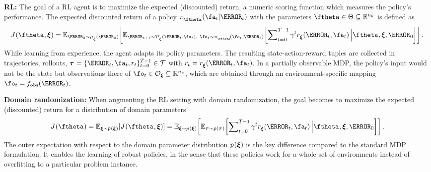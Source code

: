 \documentclass[utf8]{frontiersSCNS} %
\begin{document}
\noindent\textbf{\acf{RL}:} The goal of a \ac{RL} agent is to maximize the expected (discounted) return, a numeric scoring function which measures the policy's performance.
The expected discounted return of a policy $\pol[\polparams]{\given{\fa_t}{\fs_t}}$ with the parameters $\polparams \in \Theta \subseteq \RR^{\dimpolparam}$ is defined as
\begin{equation}
	\label{eq_sota_edr}
	\edr{\polparams,\domparams} =
	\Esub{\fs_0 \sim \initstatedistr*[\domparams]{\fs_0}}{
		\Esub{ \fs_{t+1} \sim \transprob*[\domparams]{\fs_t,\fa_t},\ \fa_t \sim \pol[\polparams]{\given{\fa_t}{\fs_t}} }{ \sum\nolimits_{t=0}^{T-1} \gamma^t \rewfcn[\domparams]{\fs_t, \fa_t} \Big| \polparams, \domparams, \fs_0}
	}.
\end{equation}
While learning from experience, the agent adapts its policy parameters.
The resulting state-action-reward tuples are collected in trajectories, \aka rollouts, $\traj = \set[t=0][T-1]{\fs_t,\fa_t,\rewsym_t} \in \trajspace$ with $\rewsym_t = \rewfcn[\domparams]{\fs_t, \fa_t}$.
In a partially observable \ac{MDP}, the policy's input would not be the state but observations there of ${\fo_t \in \obsset[\domparams] \subseteq \RR^{\dimobs}}$, which are obtained through an environment-specific mapping $\fo_t = f_\text{obs}(\fs_t)$.

\noindent\textbf{Domain randomization:} When augmenting the \ac{RL} setting with domain randomization, the goal becomes to maximize the expected (discounted) return for a distribution of domain parameters
\begin{equation}
	\label{eq_sota_eedr}
	\eedr{\polparams} = 
	\Esub{\domparams \sim \domparamdistr*{\domparams}}{\edr{\polparams,\domparams}} = 
	\Esub{\domparams \sim \domparamdistr*{\domparams}}{
		\Esub{\traj \sim p(\traj)}{\sum\nolimits_{t=0}^{T-1} \gamma^t \rewfcn[\domparams]{\fs_t, \fa_t} \Big| \polparams, \domparams, \fs_0}%
	}.
\end{equation}
The outer expectation with respect to the domain parameter distribution $\domparamdistr{\domparams}$ is the key difference compared to the standard \ac{MDP} formulation.
It enables the learning of robust policies, in the sense that these policies work for a whole set of environments instead of overfitting to a particular problem instance.


\end{document}

